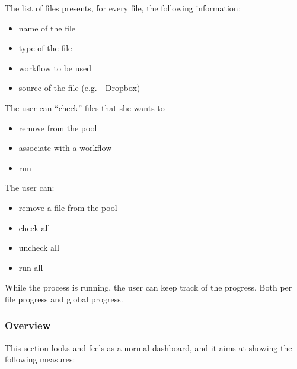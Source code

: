\documentclass[12pt,svgnames]{memoir}
\begin{document}
The list of files presents, for every file, the following information:

\begin{itemize}
\itemsep1pt\parskip0pt
\item
  name of the file
\item
  type of the file
\item
  workflow to be used
\item
  source of the file (e.g. - Dropbox)
\end{itemize}

The user can ``check'' files that she wants to

\begin{itemize}
\itemsep1pt\parskip0pt
\item
  remove from the pool
\item
  associate with a workflow
\item
  run
\end{itemize}

The user can:

\begin{itemize}
\itemsep1pt\parskip0pt
\item
  remove a file from the pool
\item
  check all
\item
  uncheck all
\item
  run all
\end{itemize}

While the process is running, the user can keep track of the progress.
Both per file progress and global progress.

\subsubsection*{Overview}\label{overview}

This section looks and feels as a normal dashboard, and it aims at
showing the following measures:
\end{document}
